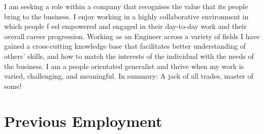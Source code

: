 \documentclass[]{deedy-resume-openfont-wjl}
\begin{document}
%
%


%
%
\vspace{-\topsep} %
\begin{center}
  \vspace{-\topsep} %
  \huge\color{subheadings}
\end{center}

I am seeking a role within a company that recognises the value that its people bring to the business.
I enjoy working in a highly collaborative environment in which people f eel empowered and engaged in their day-to-day work and their overall career progression.
Working as an Engineer across a variety of fields I have gained a cross-cutting knowledge base that facilitates better understanding of others' skills, and how to match the interests of the individual with the needs of the business.
I am a people orientated generalist and thrive when my work is varied, challenging, and meaningful.
\newline
In summary: A jack of all trades, master of some!

%
%
\sectionsep{}\section{Previous Employment}










\end{document}
